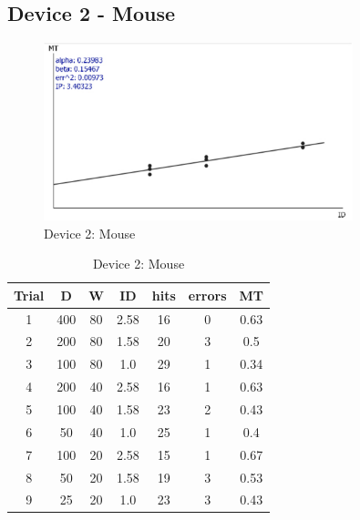 \documentclass[a4paper,twoside,10pt]{article}
\begin{document}
\newpage
\subsection*{Device 2 - Mouse}
\vspace{1cm}
\begin{figure}[ht]
	\centering
		\includegraphics[width=0.80\textwidth]{Mouse.pdf}
	\caption{Device 2: Mouse}
	\label{fig:Mouse}
\end{figure}
\vspace{1cm}
\begin{table}[ht]
	\centering
		\begin{tabular}{|c|c|c|c|c|c|c|}
			\hline
			Trial &	D	& W	& ID	& hits	& errors	& MT\\
			\hline
			1	& 400	& 80	& 2.58	& 16	& 0	& 0.63 \\
			2	& 200	& 80	& 1.58	& 20	& 3	& 0.5 \\
			3	& 100	& 80	& 1.0	& 29	& 1	& 0.34 \\
			4	& 200	& 40	& 2.58	& 16	& 1	& 0.63 \\
			5	& 100	& 40	& 1.58	& 23	& 2	& 0.43 \\
			6	& 50	& 40	& 1.0	& 25	& 1 &	0.4 \\
			7	& 100	& 20	& 2.58	& 15	& 1	& 0.67 \\
			8	& 50	& 20	& 1.58	& 19	& 3	& 0.53 \\
			9	& 25	& 20	& 1.0	& 23	& 3	& 0.43 \\
			\hline
		\end{tabular}
	\caption{Device 2: Mouse}
	\label{tab:PerformanceOfMouse}
\end{table}

\newpage
\end{document}
